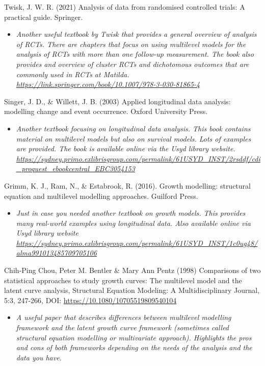 \documentclass[
]{book}
\providecommand{\tightlist}{%
  \setlength{\itemsep}{0pt}\setlength{\parskip}{0pt}}
\begin{document}
Twisk, J. W. R. (2021) Analysis of data from randomised controlled trials: A practical guide. Springer.

\begin{itemize}
\tightlist
\item
  \emph{Another useful textbook by Twisk that provides a general overview of analysis of RCTs. There are chapters that focus on using multilevel models for the analysis of RCTs with more than one follow-up measurement. The book also provides and overview of cluster RCTs and dichotomous outcomes that are commonly used in RCTs at Matilda. \url{https://link.springer.com/book/10.1007/978-3-030-81865-4} }
\end{itemize}

Singer, J. D., \& Willett, J. B. (2003) Applied longitudinal data analysis: modelling change and event occurrence. Oxford University Press.

\begin{itemize}
\tightlist
\item
  \emph{Another textbook focusing on longitudinal data analysis. This book contains material on multilevel models but also on survival models. Lots of examples are provided. The book is available online via the Usyd library website. \url{https://sydney.primo.exlibrisgroup.com/permalink/61USYD_INST/2rsddf/cdi_proquest_ebookcentral_EBC3054153}}
\end{itemize}

Grimm, K. J., Ram, N., \& Estabrook, R. (2016). Growth modelling: structural equation and multilevel modelling approaches. Guilford Press.

\begin{itemize}
\tightlist
\item
  \emph{Just in case you needed another textbook on growth models. This provides many real-world examples using longitudinal data. Also available online via Usyd library website \url{https://sydney.primo.exlibrisgroup.com/permalink/61USYD_INST/1c0ug48/alma991013485709705106}}
\end{itemize}

Chih‐Ping Chou, Peter M. Bentler \& Mary Ann Pentz (1998) Comparisons of two statistical approaches to study growth curves: The multilevel model and the latent curve analysis, Structural Equation Modeling: A Multidisciplinary Journal, 5:3, 247-266, DOI: \url{https://10.1080/10705519809540104}

\begin{itemize}
\tightlist
\item
  \emph{A useful paper that describes differences between multilevel modelling framework and the latent growth curve framework (sometimes called structural equation modelling or multivariate approach). Highlights the pros and cons of both frameworks depending on the needs of the analysis and the data you have. }
\end{itemize}
\end{document}
